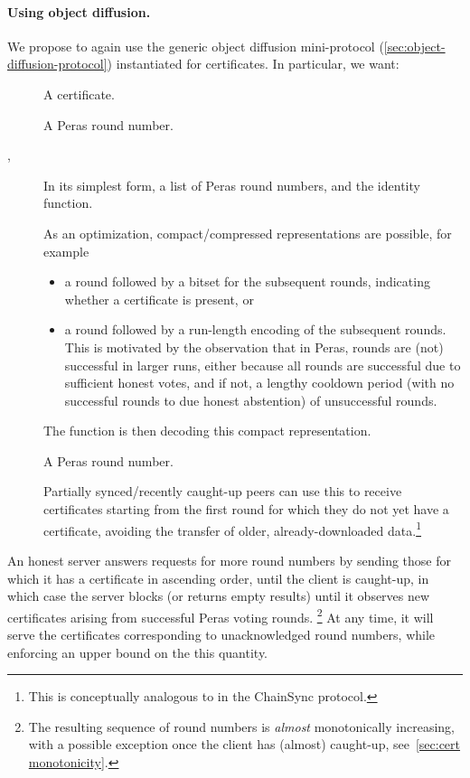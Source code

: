 \paragraph{Using object diffusion.}

We propose to again use the generic object diffusion mini-protocol (\cref{sec:object-diffusion-protocol}) instantiated for certificates.
In particular, we want:

\begin{description}
\item []
  A certificate.
\item []
  A Peras round number.
\item [, ]
  In its simplest form, a list of Peras round numbers, and the identity function.

  As an optimization, compact/compressed representations are possible, for example
  \begin{itemize}
  \item
    a round followed by a bitset for the subsequent rounds, indicating whether a certificate is present, or
  \item
    a round followed by a run-length encoding of the subsequent rounds.
    This is motivated by the observation that in Peras, rounds are (not) successful in larger runs, either because all rounds are successful due to sufficient honest votes, and if not, a lengthy cooldown period (with no successful rounds to due honest abstention) of unsuccessful rounds.
  \end{itemize}
  The  function is then decoding this compact representation.
\item []
  A Peras round number.

  Partially synced/recently caught-up peers can use this to receive certificates starting from the first round for which they do not yet have a certificate, avoiding the transfer of older, already-downloaded data.\footnote{
  This is conceptually analogous to  in the ChainSync protocol.}
\end{description}

An honest server answers requests for more round numbers by sending those for which it has a certificate in ascending order, until the client is caught-up, in which case the server blocks (or returns empty results) until it observes new certificates arising from successful Peras voting rounds.%
\footnote{The resulting sequence of round numbers is \emph{almost} monotonically increasing, with a possible exception once the client has (almost) caught-up, see~\cref{sec:cert monotonicity}.}
At any time, it will serve the certificates corresponding to unacknowledged round numbers, while enforcing an upper bound on the this quantity.


